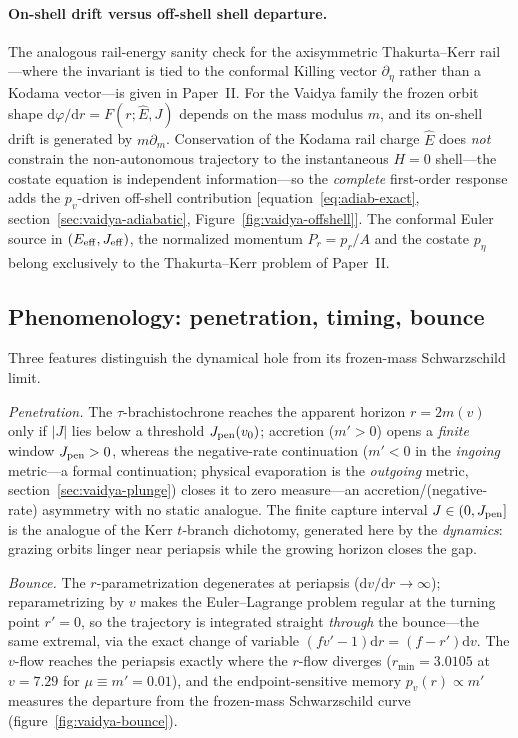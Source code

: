 \documentclass[12pt]{iopart}
\newcommand{\Ehat}{\hat E}
\newcommand{\Jpen}{J_{\rm pen}}
\newcommand{\dd}{\mathrm{d}}
\begin{document}
\paragraph{On-shell drift versus off-shell shell departure.} The analogous rail-energy sanity
check for the axisymmetric Thakurta--Kerr rail---where the invariant is tied to the
conformal Killing vector $\partial_\eta$ rather than a Kodama vector---is given in
Paper~II. For the Vaidya family the frozen orbit shape
$\mathrm{d}\varphi/\mathrm{d}r=F(r;\Ehat,J)$ depends on the mass modulus $m$, and its
on-shell drift is generated by $m\partial_m$. Conservation of the Kodama rail charge
$\Ehat$ does \emph{not} constrain the non-autonomous trajectory to the instantaneous
$H=0$ shell---the costate equation is independent information---so the \emph{complete}
first-order response adds the $p_v$-driven off-shell contribution
[equation~\eqref{eq:adiab-exact}, section~\ref{sec:vaidya-adiabatic},
Figure~\ref{fig:vaidya-offshell}]. The conformal Euler source in $(E_{\rm eff},J_{\rm eff})$,
the normalized momentum $P_r=p_r/A$ and the costate $p_\eta$ belong exclusively to the
Thakurta--Kerr problem of Paper~II.


\subsection{Phenomenology: penetration, timing, bounce}
\label{sec:vaidya-pheno}
Three features distinguish the dynamical hole from its frozen-mass
Schwarzschild limit.

\emph{Penetration.} The $\tau$-brachistochrone reaches the apparent horizon
$r=2m(v)$ only if $|J|$ lies below a threshold $\Jpen(v_0)$; accretion ($m'>0$)
opens a \emph{finite} window $\Jpen>0$, whereas the negative-rate continuation
($m'<0$ in the \emph{ingoing} metric---a formal continuation; physical evaporation is
the \emph{outgoing} metric, section~\ref{sec:vaidya-plunge}) closes it to zero
measure---an accretion/(negative-rate) asymmetry with no static analogue. The
finite capture interval $J\in(0,\Jpen]$ is the analogue of the Kerr $t$-branch
dichotomy, generated here by the \emph{dynamics}: grazing orbits linger near
periapsis while the growing horizon closes the gap.

\emph{Bounce.} The $r$-parametrization degenerates at periapsis
($\dd v/\dd r\to\infty$); reparametrizing by $v$ makes the Euler--Lagrange
problem regular at the turning point $r'=0$, so the trajectory is integrated
straight \emph{through} the bounce---the same extremal, via the exact change of
variable $(f v'-1)\dd r=(f-r')\dd v$. The $v$-flow reaches the periapsis exactly
where the $r$-flow diverges ($r_{\min}=3.0105$ at $v=7.29$ for $\mu\equiv m'=0.01$),
and the endpoint-sensitive memory $p_v(r)\propto m'$ measures the departure from the
frozen-mass Schwarzschild curve (figure~\ref{fig:vaidya-bounce}).
\end{document}
